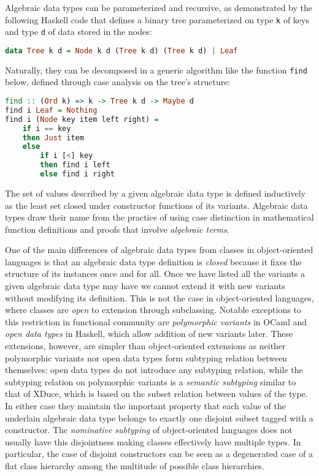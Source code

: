 \documentclass[preprint]{sigplanconf}
\makeatletter
\DeclareRobustCommand{\code}[1]{{\lstinline[breaklines=false,escapechar=@]{#1}}}
\DeclareRobustCommand{\codehaskell}[1]{{\lstinline[breaklines=false,language=Haskell]{#1}}}
\makeatother
\begin{document}
Algebraic data types can be parameterized and recursive, as demonstrated by the 
following Haskell code that defines a binary tree parameterized on type 
\codehaskell{k} of keys and type \codehaskell{d} of data stored in the nodes:

\begin{lstlisting}[language=Haskell]
data Tree k d = Node k d (Tree k d) (Tree k d) | Leaf
\end{lstlisting}

Naturally, they can be decomposed in a generic algorithm like the function 
\code{find} below, defined through case analysis on the tree's structure:

\begin{lstlisting}[language=Haskell]
find :: (Ord k) => k -> Tree k d -> Maybe d
find i Leaf = Nothing
find i (Node key item left right) = 
    if i == key 
    then Just item 
    else 
        if i [<] key 
        then find i left 
        else find i right
\end{lstlisting}

The set of values described by a given algebraic data type is defined 
inductively as the least set closed under constructor functions of its variants.
Algebraic data types draw their name from the practice of using case distinction 
in mathematical function definitions and proofs that involve \emph{algebraic 
terms}.

One of the main differences of algebraic data types from classes in 
object-oriented languages is that an algebraic data type definition is 
\emph{closed} because it fixes the structure of its instances once and for all. 
Once we have listed all the variants a given algebraic data type may have we 
cannot extend it with new variants without modifying its definition. This is not 
the case in object-oriented languages, where classes are \emph{open} to 
extension through subclassing. Notable exceptions to this restriction in 
functional community are \emph{polymorphic variants} in OCaml\cite{garrigue-98} 
and \emph{open data types} in Haskell\cite{LohHinze2006}, which allow addition 
of new variants later. These extensions, however, are simpler than object-oriented 
extensions as neither polymorphic variants nor open data types form subtyping 
relation between themselves: open data types do not introduce any subtyping 
relation, while the subtyping relation on polymorphic variants is a 
\emph{semantic subtyping} similar to that of XDuce\cite{HosoyaPierce2000}, which 
is based on the subset relation between values of the type. In either case they 
maintain the important property that each value of the underlain algebraic data 
type belongs to exactly one disjoint subset tagged with a constructor. The 
\emph{nominative subtyping} of object-oriented languages does not usually have 
this disjointness making classes effectively have multiple types. In particular, 
the case of disjoint constructors can be seen as a degenerated case of a flat 
class hierarchy among the multitude of possible class hierarchies.
\end{document}
